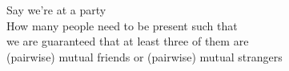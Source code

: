 \documentclass[preview]{standalone}
\begin{document}
\begin{center}
Say we're at a party \\ How many people need to be present such that \\ we are guaranteed that at least three of them are \\ (pairwise) mutual friends or (pairwise) mutual strangers
\end{center}
\end{document}
